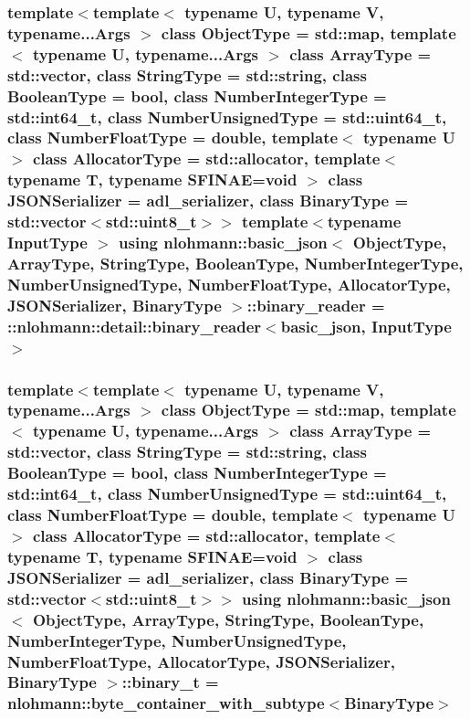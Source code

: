 \subsubsection[{\texorpdfstring{binary\+\_\+reader}{binary_reader}}]{\setlength{\rightskip}{0pt plus 5cm}template$<$template$<$ typename U, typename V, typename...\+Args $>$ class Object\+Type = std\+::map, template$<$ typename U, typename...\+Args $>$ class Array\+Type = std\+::vector, class String\+Type  = std\+::string, class Boolean\+Type  = bool, class Number\+Integer\+Type  = std\+::int64\+\_\+t, class Number\+Unsigned\+Type  = std\+::uint64\+\_\+t, class Number\+Float\+Type  = double, template$<$ typename U $>$ class Allocator\+Type = std\+::allocator, template$<$ typename T, typename S\+F\+I\+N\+A\+E=void $>$ class J\+S\+O\+N\+Serializer = adl\+\_\+serializer, class Binary\+Type  = std\+::vector$<$std\+::uint8\+\_\+t$>$$>$ template$<$typename Input\+Type $>$ using {\bf nlohmann\+::basic\+\_\+json}$<$ Object\+Type, Array\+Type, String\+Type, Boolean\+Type, Number\+Integer\+Type, Number\+Unsigned\+Type, Number\+Float\+Type, Allocator\+Type, J\+S\+O\+N\+Serializer, Binary\+Type $>$\+::{\bf binary\+\_\+reader} =  \+::{\bf nlohmann\+::detail\+::binary\+\_\+reader}$<${\bf basic\+\_\+json}, Input\+Type$>$\hspace{0.3cm}{\ttfamily [private]}}\hypertarget{classnlohmann_1_1basic__json_a6c26be4635e562ebae8b9a142f9538b4}{}\label{classnlohmann_1_1basic__json_a6c26be4635e562ebae8b9a142f9538b4}
\subsubsection[{\texorpdfstring{binary\+\_\+t}{binary_t}}]{\setlength{\rightskip}{0pt plus 5cm}template$<$template$<$ typename U, typename V, typename...\+Args $>$ class Object\+Type = std\+::map, template$<$ typename U, typename...\+Args $>$ class Array\+Type = std\+::vector, class String\+Type  = std\+::string, class Boolean\+Type  = bool, class Number\+Integer\+Type  = std\+::int64\+\_\+t, class Number\+Unsigned\+Type  = std\+::uint64\+\_\+t, class Number\+Float\+Type  = double, template$<$ typename U $>$ class Allocator\+Type = std\+::allocator, template$<$ typename T, typename S\+F\+I\+N\+A\+E=void $>$ class J\+S\+O\+N\+Serializer = adl\+\_\+serializer, class Binary\+Type  = std\+::vector$<$std\+::uint8\+\_\+t$>$$>$ using {\bf nlohmann\+::basic\+\_\+json}$<$ Object\+Type, Array\+Type, String\+Type, Boolean\+Type, Number\+Integer\+Type, Number\+Unsigned\+Type, Number\+Float\+Type, Allocator\+Type, J\+S\+O\+N\+Serializer, Binary\+Type $>$\+::{\bf binary\+\_\+t} =  {\bf nlohmann\+::byte\+\_\+container\+\_\+with\+\_\+subtype}$<$Binary\+Type$>$}\hypertarget{classnlohmann_1_1basic__json_ad6c955145bebde84d93991ffed7cd389}{}\label{classnlohmann_1_1basic__json_ad6c955145bebde84d93991ffed7cd389}



